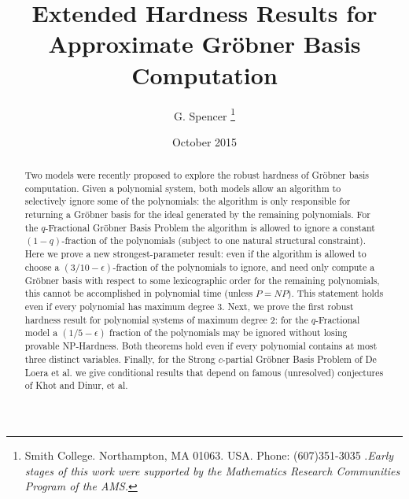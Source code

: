 \documentclass{article}
\title{Extended
Hardness Results for\\
 Approximate Gr\"{o}bner Basis Computation}
\author{G. Spencer \thanks{Smith College. Northampton, MA 01063. USA. Phone: (607)351-3035 .\textit{Early stages of this work were supported by the Mathematics Research Communities Program of the AMS.}}}
\date{October 2015}
\begin{document}
\maketitle

\begin{abstract}
Two models were recently proposed to explore the robust hardness of Gr\"{o}bner basis computation. Given a polynomial system, both models allow an algorithm to selectively ignore some of the polynomials: the algorithm is only responsible for returning a Gr\"{o}bner basis for the ideal generated by the remaining polynomials. For the $q$-Fractional Gr\"{o}bner Basis Problem the algorithm is allowed to ignore a constant $(1-q)$-fraction of the polynomials (subject to one natural structural constraint). Here we prove a new strongest-parameter result: even if the algorithm is allowed to choose a $(3/10-\epsilon)$-fraction of the polynomials to ignore, and need only compute a Gr\"{o}bner basis with respect to some lexicographic order for the remaining polynomials, this cannot be accomplished in polynomial time (unless $P=NP$). This statement holds even if every polynomial has maximum degree 3. Next, we prove the first robust hardness result for polynomial systems of maximum degree 2: for the $q$-Fractional model a $(1/5-\epsilon)$ fraction of the polynomials may be ignored without losing provable NP-Hardness. Both theorems hold even if every polynomial contains at most three distinct variables. Finally, for the Strong $c$-partial Gr\"{o}bner Basis Problem of De Loera et al. we give conditional results that depend on famous (unresolved) conjectures of Khot and Dinur, et al.




\end{abstract}
\end{document}
